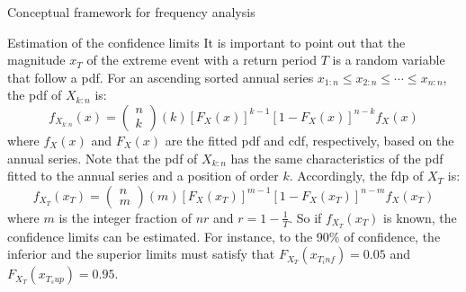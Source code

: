 \documentclass[8pt]{beamer}
\renewcommand{\emph}[1]{\textcolor{myorange}{#1}}
\begin{document}
\begin{frame}{Conceptual framework for  frequency analysis}
    \begin{block}{Estimation of the confidence limits}
        It is important to point out that the magnitude $x_T$ of the extreme event with a return period $T$ is a random variable that follow a \emph{pdf}. For an   ascending sorted annual series $x_{1:n} \leq x_{2:n} \leq \cdots \leq x_{n:n}$, the \emph{pdf} of $X_{k:n}$ is:
        \[
            f_{X_{k:n}} (x) = \left( \begin{array}{c} n \\ k \end{array} \right) (k)  \left[ F_X (x) \right]^{k-1} \left[ 1 - F_X (x) \right]^{n-k} f_X (x)
            \]
            where $f_X (x)$ and $F_X (x)$ are the fitted \emph{pdf} and \emph{cdf}, respectively, based on the annual series. Note that the \emph{pdf} of $X_{k:n}$ has the same characteristics of the \emph{pdf} fitted to the annual series and a position of order $k$. Accordingly, the \emph{fdp} of $X_T$ is:
        \[
            f_{X_T } (x_T) = \left( \begin{array}{c} n \\ m \end{array} \right) (m)  \left[ F_X (x_T) \right]^{m-1} \left[ 1 - F_X (x_T) \right]^{n-m} f_X (x_T)
            \]
            where $m$ is the integer fraction of $nr$ and $r = 1 -\frac{1}{T}$. So if $f_{X_T} (x_T)$ is known, the confidence limits can be estimated. For instance, to the 90\% of confidence, the inferior and the superior limits must satisfy  that $F_{X_T} (x_{T_inf}) = 0.05$ and $F_{X_T} (x_{T_sup}) = 0.95$.                 
\end{block}

\end{frame}
\end{document}
